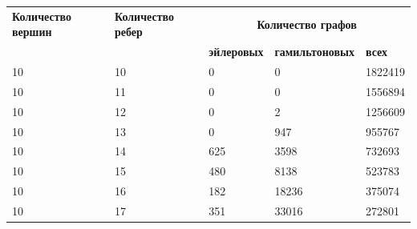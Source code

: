 \documentclass[12pt]{article}
\begin{document}
	\vspace{1.5cm}
	
	\begin{tabular}{|m{3cm}|m{3cm}|m{2.5cm}|m{3.5cm}|m{2cm}|}
		\hline
		{\bf Количество вершин} & {\bf Количество ребер} & \multicolumn{3}{|c|}{\bf Количество графов}\\
		\cline{3-5}
		& & {\bf эйлеровых} &{\bf гамильтоновых} & {\bf всех} \\
		\hline
		10 & 10 & 0 & 0 & 1822419 \\
		\hline
		10 & 11 & 0 & 0 & 1556894 \\
		\hline
		10 & 12 & 0 & 2 & 1256609 \\
		\hline
		10 & 13 & 0 & 947 & 955767 \\
		\hline
		10 & 14 & 625 & 3598 & 732693 \\
		\hline
		10 & 15 & 480 & 8138 & 523783 \\
		\hline
		10 & 16 & 182 & 18236 & 375074 \\
		\hline
		10 & 17 & 351 & 33016 & 272801 \\
		\hline
	\end{tabular}
\end{document}
